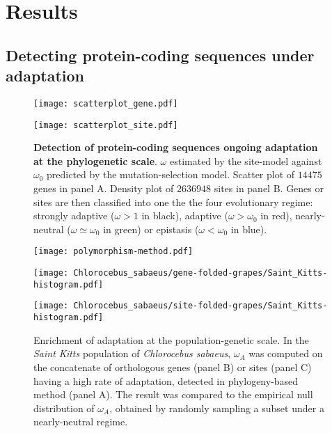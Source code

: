 \documentclass{article}
\begin{document}
\section*{Results}

\subsection*{Detecting protein-coding sequences under adaptation}

\begin{figure*}[h]
	\centering
	\begin{minipage}{0.49\linewidth}
		\texttt{[image: scatterplot\_gene.pdf]}
	\end{minipage}
	\hfill
	\begin{minipage}{0.49\linewidth}
		\texttt{[image: scatterplot\_site.pdf]}
	\end{minipage}
	\hfill
	\label{fig:scatterplot}
	\caption{ \textbf{Detection of protein-coding sequences ongoing adaptation at the phylogenetic scale}.
		$\omega$ estimated by the site-model against $\omega_{0}$ predicted by the mutation-selection model.
		Scatter plot of $14475$ genes in panel A. Density plot of $2636948$ sites in panel B.
		Genes or sites are then classified into one the the four evolutionary regime: strongly adaptive ($\omega > 1$ in black), adaptive ($\omega > \omega_{0}$ in red), nearly-neutral ($\omega \simeq \omega_{0}$ in green) or epistasis ($\omega < \omega_{0}$ in blue). }
\end{figure*}

\begin{figure*}[h]
	\centering
	\texttt{[image: polymorphism-method.pdf]}
	\hfill
	\begin{minipage}{0.49\linewidth}
		\texttt{[image: Chlorocebus\_sabaeus/gene-folded-grapes/Saint\_Kitts-histogram.pdf]}
	\end{minipage}
	\hfill
	\begin{minipage}{0.49\linewidth}
		\texttt{[image: Chlorocebus\_sabaeus/site-folded-grapes/Saint\_Kitts-histogram.pdf]}
	\end{minipage}
	\label{fig:histogram}
	\hfill
	\caption{
		Enrichment of adaptation at the population-genetic scale.
		In the \textit{Saint Kitts} population of \textit{Chlorocebus sabaeus}, $\omega_A$ was computed on the concatenate of orthologous genes (panel B) or sites (panel C) having a high rate of adaptation, detected in phylogeny-based method (panel A).
		The result was compared to the empirical null distribution of $\omega_A$, obtained by randomly sampling a subset under a nearly-neutral regime.
	}
\end{figure*}
\end{document}

